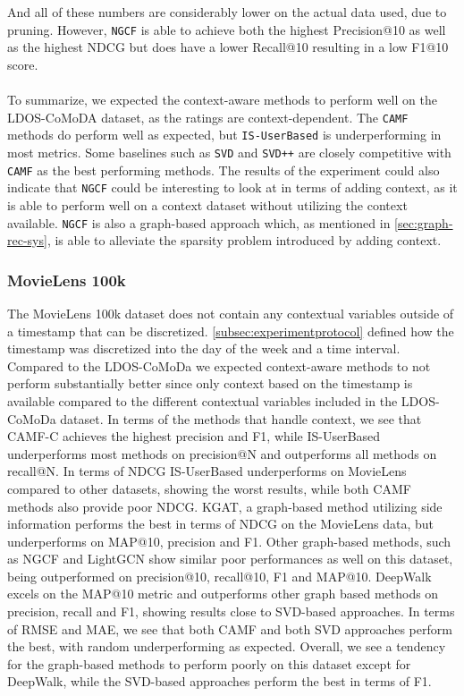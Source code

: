 And all of these numbers are considerably lower on the actual data used, due to pruning.
However, \texttt{NGCF} is able to achieve both the highest Precision@10 as well as the highest NDCG but does have a lower Recall@10 resulting in a low F1@10 score.
\\\\
To summarize, we expected the context-aware methods to perform well on the LDOS-CoMoDA dataset, as the ratings are context-dependent. 
The \texttt{CAMF} methods do perform well as expected, but \texttt{IS-UserBased} is underperforming in most metrics.
Some baselines such as \texttt{SVD} and \texttt{SVD++} are closely competitive with \texttt{CAMF} as the best performing methods.
The results of the experiment could also indicate that \texttt{NGCF} could be interesting to look at in terms of adding context, as it is able to perform well on a context dataset without utilizing the context available. 
\texttt{NGCF} is also a graph-based approach which, as mentioned in \autoref{sec:graph-rec-sys}, is able to alleviate the sparsity problem introduced by adding context.

\subsubsection{MovieLens 100k}
The MovieLens 100k dataset does not contain any contextual variables outside of a timestamp that can be discretized.
\autoref{subsec:experimentprotocol} defined how the timestamp was discretized into the day of the week and a time interval.
Compared to the LDOS-CoMoDa we expected context-aware methods to not perform substantially better since only context based on the timestamp is available compared to the different contextual variables included in the LDOS-CoMoDa dataset. 
In terms of the methods that handle context, we see that CAMF-C achieves the highest precision and F1, while IS-UserBased underperforms most methods on precision@N and outperforms all methods on recall@N.
In terms of NDCG IS-UserBased underperforms on MovieLens compared to other datasets, showing the worst results, while both CAMF methods also provide poor NDCG.
KGAT, a graph-based method utilizing side information performs the best in terms of NDCG on the MovieLens data, but underperforms on MAP@10, precision and F1.
Other graph-based methods, such as NGCF and LightGCN show similar poor performances as well on this dataset, being outperformed on precision@10, recall@10, F1 and MAP@10.
DeepWalk excels on the MAP@10 metric and outperforms other graph based methods on precision, recall and F1, showing results close to SVD-based approaches.
In terms of RMSE and MAE, we see that both CAMF and both SVD approaches perform the best, with random underperforming as expected.
Overall, we see a tendency for the graph-based methods to perform poorly on this dataset except for DeepWalk, while the SVD-based approaches perform the best in terms of F1.

